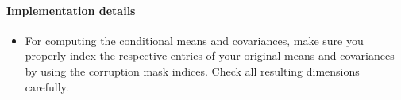 \documentclass{article}
\begin{document}
\paragraph{Implementation details}
\begin{itemize}
\item For computing the conditional means and covariances, make sure you properly index the respective entries of your original means and covariances by using the corruption mask indices. Check all resulting dimensions carefully. 
\end{itemize}



\end{document}
